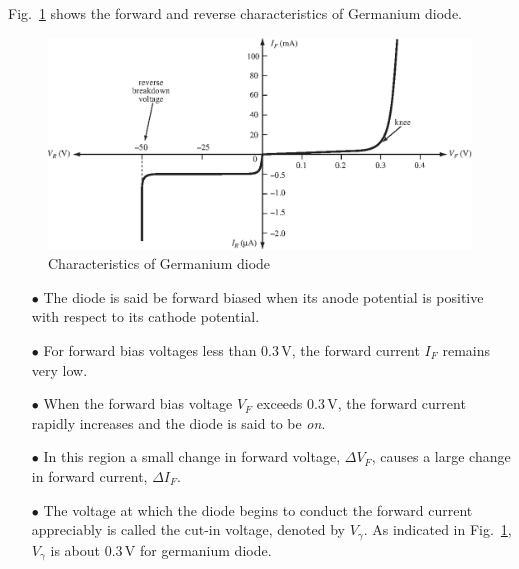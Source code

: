 Fig.~\ref{fig1.7} shows the forward and reverse characteristics of Germanium diode.
\begin{figure}[H]
\centering
\includegraphics{chap1/S3-EE-01-009.eps}
\caption{Characteristics of Germanium diode}\label{fig1.7}
\end{figure}

\begin{itemize}
\item[$\bullet$] The diode is said be forward biased when its anode potential is positive with respect to its cathode potential.

\item[$\bullet$] For forward bias voltages less than 0.3\,V, the forward current $I_{F}$ remains very low.

\item[$\bullet$] When the forward bias voltage $V_{F}$ exceeds 0.3\,V, the forward current rapidly increases and the diode is said to be {\em on}.

\item[$\bullet$] In this region a small change in forward voltage, $\Delta V_{F}$, causes a large change in forward current, $\Delta I_{F}$.

\item[$\bullet$] The voltage at which the diode begins to conduct the forward current appreciably is called the cut-in voltage, denoted by $V_{\gamma}$. As indicated in Fig.~\ref{fig1.7}, $V_{\gamma}$ is about 0.3\,V for germanium diode.
\end{itemize}

\eject

